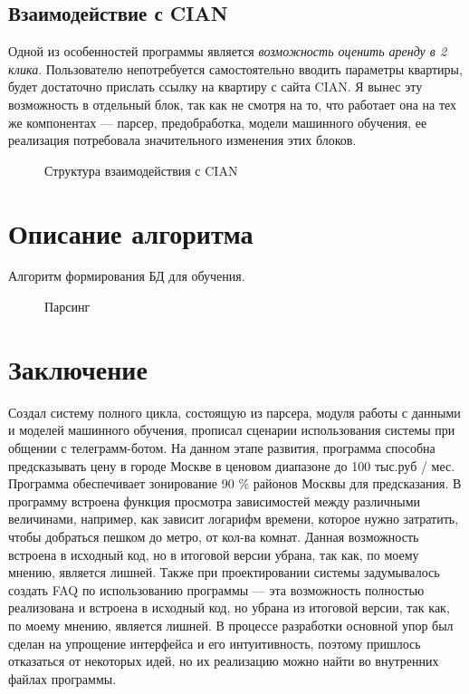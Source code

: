 \documentclass{article}
\begin{document}
		\subsection{Взаимодействие с CIAN}
		
			Одной из особенностей программы является \textit{возможность оценить аренду в 2 клика}. Пользователю непотребуется самостоятельно вводить параметры квартиры, будет достаточно прислать ссылку на квартиру с сайта CIAN. Я вынес эту возможность в отдельный блок, так как не смотря на то, что работает она на тех же компонентах --- парсер, предобработка, модели машинного обучения, ее реализация потребовала значительного изменения этих блоков.
			
			\begin{figure}[H]
				\centering
				\caption{Структура взаимодействия с CIAN}
				\label{fig:cian}
			\end{figure}
	
	\newpage
	\section{Описание алгоритма}	
		
		Алгоритм формирования БД для обучения.
		
		\begin{figure}[H]
			\centering
			\caption{Парсинг}
			\label{fig:algorithm_parsing}
		\end{figure}
	
	\newpage
	\section{Заключение}
		Создал систему полного цикла, состоящую из парсера, модуля работы с данными и моделей машинного обучения, прописал сценарии использования системы при общении с телеграмм-ботом. На данном этапе развития, программа способна предсказывать цену в городе Москве в ценовом диапазоне до 100 тыс.руб / мес. Программа обеспечивает зонирование 90 \% районов Москвы для предсказания. В программу встроена функция просмотра зависимостей между различными величинами, например, как зависит логарифм времени, которое нужно затратить, чтобы добраться пешком до метро, от кол-ва комнат. Данная возможность встроена в исходный код, но в итоговой версии убрана, так как, по моему мнению, является лишней. Также при проектировании системы задумывалось создать FAQ по использованию программы --- эта возможность полностью реализована и встроена в исходный код, но убрана из итоговой версии, так как, по моему мнению, является лишней. В процессе разработки основной упор был сделан на упрощение интерфейса и его интуитивность, поэтому пришлось отказаться от некоторых идей, но их реализацию можно найти во внутренних файлах программы.
		
\end{document}
